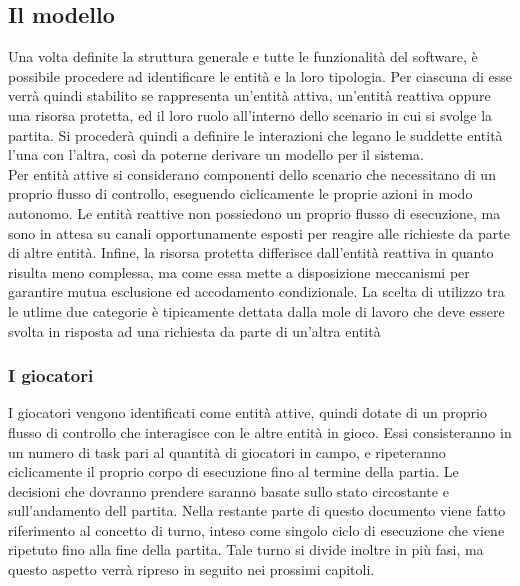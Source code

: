 \subsection{Il modello}
\label{sec:entita_coinvolte}

Una volta definite la struttura generale e tutte le funzionalità del software, è possibile procedere ad identificare le entità e la loro tipologia. Per ciascuna di esse verrà quindi stabilito se rappresenta un'entità attiva, un'entità reattiva oppure una risorsa protetta, ed il loro ruolo all'interno dello scenario in cui si svolge la partita. Si procederà quindi a definire le interazioni che legano le suddette entità l'una con l'altra, così da poterne derivare un modello per il sistema.\\

Per entità attive si considerano componenti dello scenario che necessitano di un proprio flusso di controllo, eseguendo ciclicamente le proprie azioni in modo autonomo. Le entità reattive non possiedono un proprio flusso di esecuzione, ma sono in attesa su canali opportunamente esposti per reagire alle richieste da parte di altre entità. Infine, la risorsa protetta differisce dall'entità reattiva in quanto risulta meno complessa, ma come essa mette a disposizione meccanismi per garantire mutua esclusione ed accodamento condizionale. La scelta di utilizzo tra le utlime due categorie è tipicamente dettata dalla mole di lavoro che deve essere svolta in risposta ad una richiesta da parte di un'altra entità 

\subsubsection{I giocatori}
\label{sec:entita_coinvolte_giocatori}

I giocatori vengono identificati come entità attive, quindi dotate di un proprio flusso di controllo che interagisce con le altre entità in gioco. Essi consisteranno in un numero di task pari al quantità di giocatori in campo, e ripeteranno ciclicamente il proprio corpo di esecuzione fino al termine della partia. Le decisioni che dovranno prendere saranno basate sullo stato circostante e sull'andamento dell partita. Nella restante parte di questo documento viene fatto riferimento al concetto di turno, inteso come singolo ciclo di esecuzione che viene ripetuto fino alla fine della partita. Tale turno si divide inoltre in più fasi, ma questo aspetto verrà ripreso in seguito nei prossimi capitoli.

